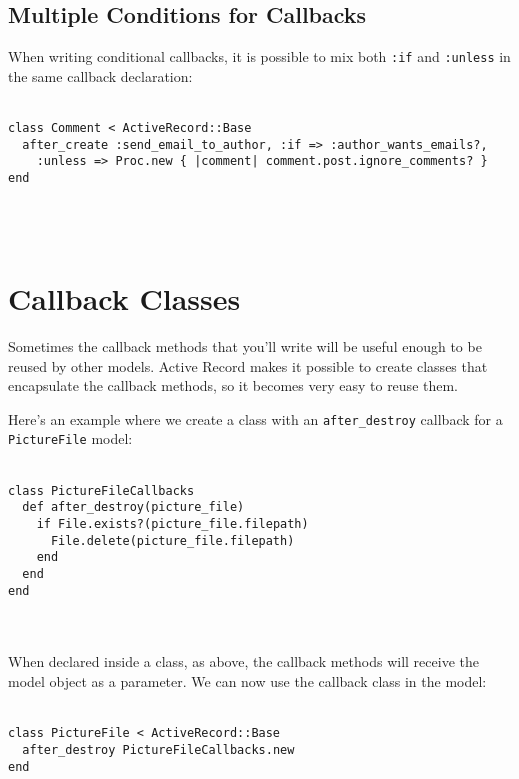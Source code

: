\documentclass[10pt]{book}
\begin{document}
\subsection{ Multiple Conditions for Callbacks}

When writing conditional callbacks, it is possible to mix both \texttt{:if} and \texttt{:unless} in the same callback declaration:
\\ \\
\begin{minipage}{\textwidth}{\scriptsize
\begin{verbatim}
class Comment < ActiveRecord::Base
  after_create :send_email_to_author, :if => :author_wants_emails?,
    :unless => Proc.new { |comment| comment.post.ignore_comments? }
end
\end{verbatim}}
\end{minipage}
\\ \\

\section{ Callback Classes}

Sometimes the callback methods that you’ll write will be useful  enough to be reused by other models. Active Record makes it possible to  create classes that encapsulate the callback methods, so it becomes very  easy to reuse them.

Here’s an example where we create a class with an \texttt{after\_destroy} callback for a \texttt{PictureFile} model:
\\ \\
\begin{minipage}{\textwidth}{\scriptsize
\begin{verbatim}
class PictureFileCallbacks
  def after_destroy(picture_file)
    if File.exists?(picture_file.filepath)
      File.delete(picture_file.filepath)
    end
  end
end
\end{verbatim}}
\end{minipage}
\\ \\

When declared inside a class, as above, the callback methods will  receive the model object as a parameter. We can now use the callback  class in the model:
\\ \\
\begin{minipage}{\textwidth}{\scriptsize
\begin{verbatim}
class PictureFile < ActiveRecord::Base
  after_destroy PictureFileCallbacks.new
end
\end{verbatim}}
\end{minipage}
\\ \\
\end{document}
